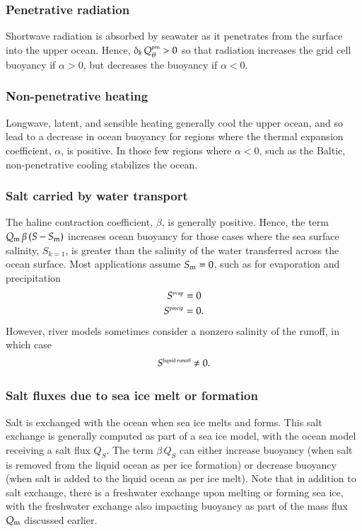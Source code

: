 \subsubsection{Penetrative radiation}

Shortwave radiation is absorbed by seawater as it penetrates from the
surface into the upper ocean. Hence, $\delta_{k} \,
Q_{\theta}^{\mbox{\tiny pen}} > 0$ so that radiation increases the
grid cell buoyancy if $\alpha > 0$, but decreases the buoyancy if
$\alpha < 0$.


\subsubsection{Non-penetrative heating}

Longwave, latent, and sensible heating generally cool the upper ocean,
and so lead to a decrease in ocean buoyancy for regions where the
thermal expansion coefficient, $\alpha$, is positive.  In those few
regions where $\alpha < 0$, such as the Baltic, non-penetrative
cooling stabilizes the ocean. 

\subsubsection{Salt carried by water transport}

The haline contraction coefficient, $\beta$, is generally positive.
Hence, the term $Q_{\mbox{\scriptsize m}} \, \beta \, (S - S_{\mbox{\scriptsize m}})$ increases ocean buoyancy
for those cases where the sea surface salinity, $S_{k=1}$, is greater
than the salinity of the water transferred across the ocean surface.
Most applications assume $S_{\mbox{\scriptsize m}} = 0$, such as for evaporation and
precipitation
\begin{align}
 S^{\mbox{\tiny evap}} &= 0 
\\
 S^{\mbox{\tiny precip}} &= 0.
\end{align}
 However, river models sometimes consider a nonzero salinity of the
 runoff, in which case 
\begin{equation}
 S^{\mbox{\tiny liquid runoff}} \ne 0. 
\end{equation}


\subsubsection{Salt fluxes due to sea ice melt or formation}

Salt is exchanged with the ocean when sea ice melts and forms.  This
salt exchange is generally computed as part of a sea ice model, with
the ocean model receiving a salt flux $Q_{S}$.  The term $\beta \,
Q_{S}$ can either increase buoyancy (when salt is removed from the
liquid ocean as per ice formation) or decrease buoyancy (when salt is
added to the liquid ocean as per ice melt).  Note that in addition to
salt exchange, there is a freshwater exchange upon melting or forming
sea ice, with the freshwater exchange also impacting buoyancy as part
of the mass flux $Q_{\mbox{\scriptsize m}}$ discussed earlier.


